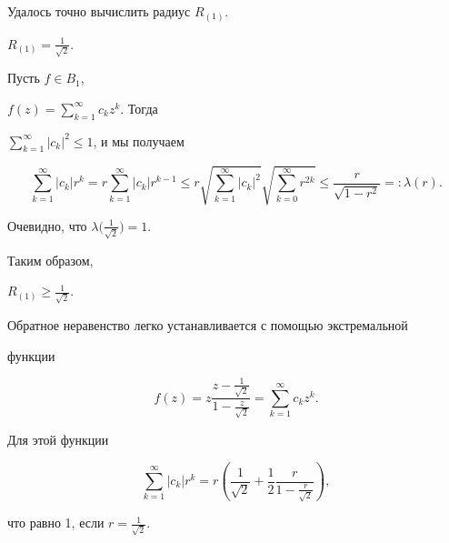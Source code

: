Удалось точно вычислить радиус $R_{(1)}$.





\begin{thm}


$R_{(1)}=\frac{1}{\sqrt{2}}$.


\end{thm}





\begin{pf}


Пусть $f\in B_1$,


$f(z)=\sum\limits^{\infty}_{k=1}c_kz^k$. Тогда


$\sum\limits^{\infty}_{k=1}|c_k|^2\leq 1$, и мы получаем


$$


\sum\limits^{\infty}_{k=1}|c_k|r^k=r\sum\limits^{\infty}_{k=1}


|c_k|r^{k-1}\le r\sqrt{\sum\limits^{\infty}_{k=1}|c_k|^2}


\sqrt{\sum\limits^{\infty}_{k=0}r^{2k}}\leq


\frac{r}{\sqrt{1-r^2}}=:\lambda(r).


$$


Очевидно, что $\lambda\big(\frac1{\sqrt2}\big)=1$.


Таким образом,


$R_{(1)}\geq\frac1{\sqrt2}$.





Обратное неравенство легко устанавливается с помощью экстремальной


функции


$$


f(z)=z\frac{z-\frac1{\sqrt2}}{1-\frac{z}{\sqrt2}}=


\sum\limits_{k=1}^{\infty}c_kz^k.


$$


Для этой функции


$$


\sum\limits_{k=1}^{\infty}|c_k|r^k=


r\left(\frac{1}{\sqrt{2}}+\frac{1}{2}


\frac{r}{1-\frac{r}{\sqrt2}}\right),


$$


что равно 1, если $r=\frac{1}{\sqrt2}$.


\end{pf}





